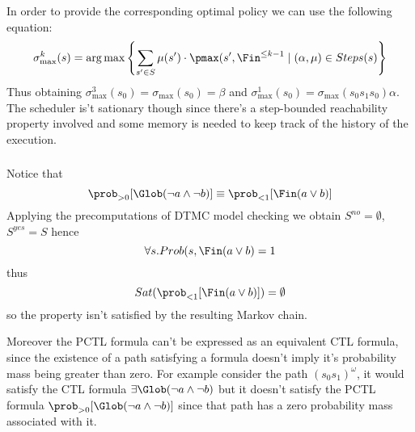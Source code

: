 In order to provide the corresponding optimal policy we can use the following
equation:
\[
	\sigma_{\max}^k(s) = \arg\max \left\{ \sum_{s' \in S} \mu(s')\cdot\pmax(s', \Fin^{\le k-1} \mid (\alpha, \mu) \in Steps(s) \right\}
\]
Thus obtaining $\sigma_{\max}^3(s_0) = \sigma_{\max}(s_0) = \beta$ and
$\sigma_{\max}^1(s_0) = \sigma_{\max}(s_0s_1s_0) \alpha$.
The scheduler is't sationary though since there's a step-bounded reachability
property involved and some memory is needed to keep track of the history of the
execution.

\subsubsection{}

Notice that
\[
	\prob_{> 0} [\Glob (\neg a \wedge \neg b)] \equiv \prob_{< 1}[\Fin (a \vee b)]
\]
Applying the precomputations of DTMC model checking we obtain
$S^{no} = \emptyset$, $S^{yes} = S$ hence
\[
	\forall s. Prob(s, \Fin (a \vee b) = 1
\]
thus
\[
	Sat(\prob_{< 1}[\Fin (a \vee b)]) = \emptyset
\]
so the property isn't satisfied by the resulting Markov chain.

Moreover the PCTL formula can't be expressed as an equivalent CTL formula,
since the existence of a path satisfying a formula doesn't imply it's
probability mass being greater than zero. For example consider the path
$(s_0s_1)^\omega$, it would satisfy the CTL formula
$\exists \Glob (\neg a \wedge \neg b)$ but it doesn't satisfy the PCTL formula
$\prob_{> 0} [\Glob (\neg a \wedge \neg b)]$ since that path has a zero
probability mass associated with it.
